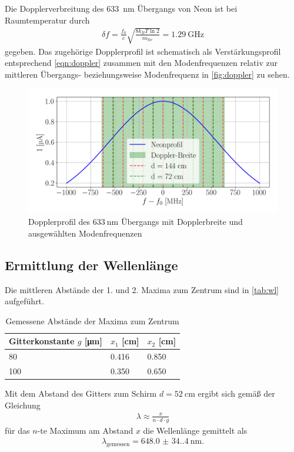 Die Dopplerverbreitung des \SI{633}{\nano\meter} Übergangs von Neon ist bei Raumtemperatur durch
\begin{align}
    \delta f = \frac{f_0}{c} \sqrt{\frac{8 k_B T \ln 2}{m_\text{Ne}}}=\SI{1.29}{\giga\hertz}
\end{align}
gegeben.
Das zugehörige Dopplerprofil ist schematisch als Verstärkungsprofil entsprechend \autoref{eqn:doppler} zusammen mit den Modenfrequenzen relativ zur mittleren Übergangs- beziehungsweise Modenfrequenz in \autoref{fig:doppler} zu sehen.
\begin{figure}[H]
    \centering
    \includegraphics[scale=0.55]{Skripte/doppler.png}
    \caption{Dopplerprofil des $\SI{633}{\nano\meter}$ Übergangs mit Dopplerbreite und ausgewählten Modenfrequenzen}\label{fig:doppler}
\end{figure}
\subsection{Ermittlung der Wellenlänge}
Die mittleren Abstände der 1. und 2. Maxima zum Zentrum sind in \autoref{tab:wl} aufgeführt.
\begin{table}[H]
  \centering
  \caption{Gemessene Abstände der Maxima zum Zentrum}
  \label{tab:wl}
  \begin{tabular}{l | l | l}
    \toprule
        {Gitterkonstante $g$ [\si{\micro\meter}]} & {$x_1$ [\si{\centi\meter}]} & {$x_2$ [\si{\centi\meter}]}\\
    \midrule
        80 & 0.416 & 0.850 \\
        100 & 0.350 & 0.650 \\
    \bottomrule
  \end{tabular}
\end{table}
Mit dem Abstand des Gitters zum Schirm $d=\SI{52}{\centi\meter}$ ergibt sich gemäß der Gleichung
\begin{align}
  \lambda\approx\frac{x}{n\cdot d\cdot g}
\end{align} 
für das $n$-te Maximum am Abstand $x$ die Wellenlänge gemittelt als
\begin{align}
  \lambda_\text{gemessen}=\SI{648.0(34.4)}{\nano\meter}\text{.}
\end{align} 